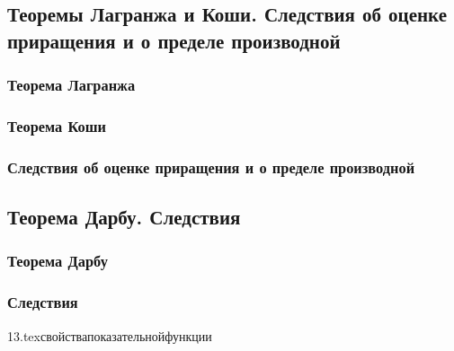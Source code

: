\subsection{\teormin Теоремы Лагранжа и Коши. Следствия об оценке приращения и о пределе производной}
\subsubsection{Теорема Лагранжа}
\subsubsection{Теорема Коши}
\subsubsection{Следствия об оценке приращения и о пределе производной}

\subsection{Теорема Дарбу. Следствия}
\subsubsection{Теорема Дарбу}
\subsubsection{Следствия}

{13.tex}{свойствапоказательнойфункции}

